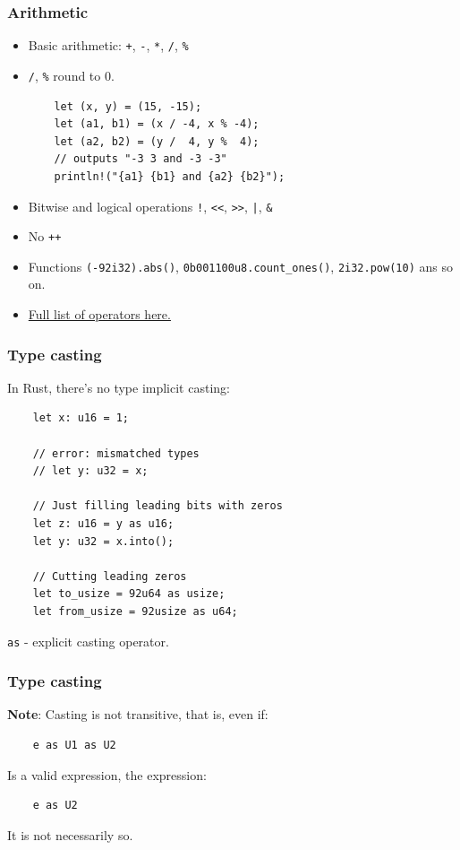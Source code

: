 \documentclass[aspectratio=1610,t]{beamer}
\begin{document}

\begin{frame}[fragile]
\frametitle{Arithmetic}
\begin{itemize}
    \item Basic arithmetic: \texttt{+}, \texttt{-}, \texttt{*}, \texttt{/}, \texttt{\%}
    \item \texttt{/}, \texttt{\%} round to 0.
\begin{verbatim}
    let (x, y) = (15, -15);
    let (a1, b1) = (x / -4, x % -4);
    let (a2, b2) = (y /  4, y %  4);
    // outputs "-3 3 and -3 -3"
    println!("{a1} {b1} and {a2} {b2}");
\end{verbatim}
    \item Bitwise and logical operations \texttt{!}, \texttt{<<}, \texttt{>>}, \texttt{|}, \texttt{\&}
    \item No \texttt{++}
    \item Functions \texttt{(-92i32).abs()}, \texttt{0b001100u8.count\_ones()}, \texttt{2i32.pow(10)} ans so on.
    \item \href{https://doc.rust-lang.org/book/appendix-02-operators.html}{Full list of operators here.}
\end{itemize}
\end{frame}


\begin{frame}[fragile]
\frametitle{Type casting}
In Rust, there's no type implicit casting:

\begin{verbatim}
    let x: u16 = 1;

    // error: mismatched types
    // let y: u32 = x;

    // Just filling leading bits with zeros
    let z: u16 = y as u16;
    let y: u32 = x.into();

    // Cutting leading zeros
    let to_usize = 92u64 as usize;
    let from_usize = 92usize as u64;
\end{verbatim}

\texttt{as} - explicit casting operator.
\end{frame}


\begin{frame}[fragile]
\frametitle{Type casting}
\textbf{Note}: Casting is not transitive, that is, even if:

\begin{verbatim}
    e as U1 as U2
\end{verbatim}

Is a valid expression, the expression:

\begin{verbatim}
    e as U2
\end{verbatim}

It is not necessarily so.
\end{frame}
\end{document}
